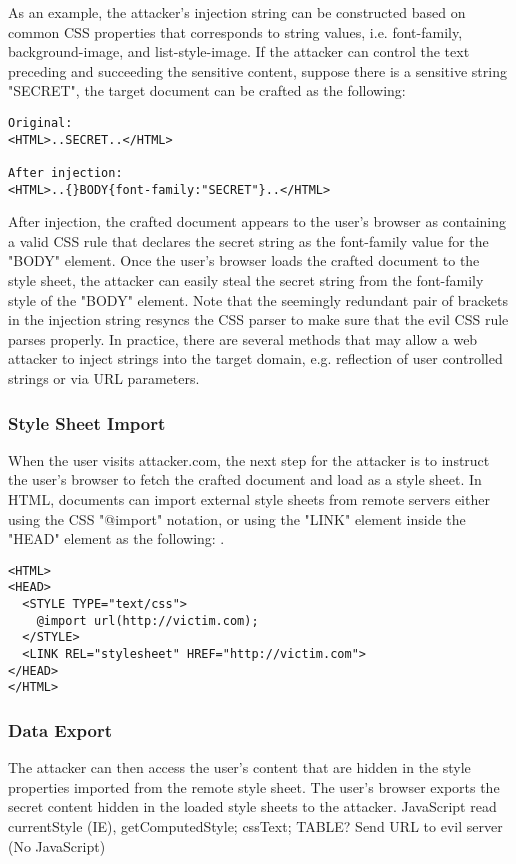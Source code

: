 \documentclass{acm_proc_article-sp}
\begin{document}
As an example, the attacker's injection string can be constructed based on common CSS properties that corresponds to string values, i.e. font-family, background-image, and list-style-image. If the attacker can control the text preceding and succeeding the sensitive content, suppose there is a sensitive string "SECRET", the target document can be crafted as the following:
\begin{verbatim}
Original:
<HTML>..SECRET..</HTML>

After injection:
<HTML>..{}BODY{font-family:"SECRET"}..</HTML>
\end{verbatim}
After injection, the crafted document appears to the user's browser as containing a valid CSS rule that declares the secret string as the font-family value for the "BODY" element. Once the user's browser loads the crafted document to the style sheet, the attacker can easily steal the secret string from the font-family style of the "BODY" element. Note that the seemingly redundant pair of brackets in the injection string resyncs the CSS parser to make sure that the evil CSS rule parses properly. In practice, there are several methods that may allow a web attacker to inject strings into the target domain, e.g. reflection of user controlled strings or via URL parameters.

\subsubsection{Style Sheet Import}
When the user visits attacker.com, the next step for the attacker is to instruct the user's browser to fetch the crafted document and load as a style sheet. In HTML, documents can import external style sheets from remote servers either using the CSS "@import" notation, or using the "LINK" element inside the "HEAD" element as the following: .
\begin{verbatim}
<HTML>
<HEAD>
  <STYLE TYPE="text/css">
    @import url(http://victim.com);
  </STYLE>
  <LINK REL="stylesheet" HREF="http://victim.com">
</HEAD>
</HTML>
\end{verbatim}

\subsubsection{Data Export}
The attacker can then access the user's content that are hidden in the style properties imported from the remote style sheet.
The user's browser exports the secret content hidden in the loaded style sheets to the attacker.
JavaScript read currentStyle (IE), getComputedStyle;
cssText;
TABLE?
Send URL to evil server (No JavaScript)
\end{document}
